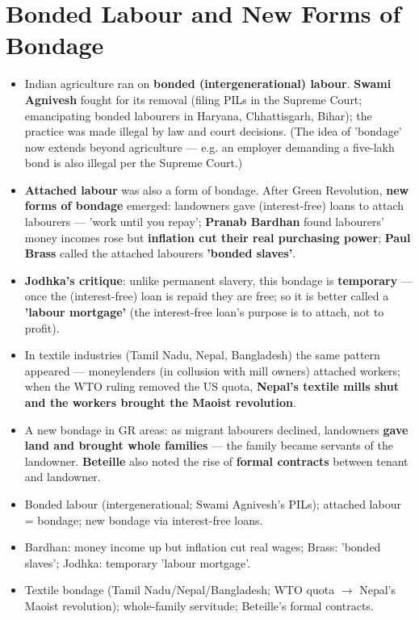 \section{Bonded Labour and New Forms of Bondage}

\begin{KeyConcept}
\begin{itemize}
\item Indian agriculture ran on \textbf{bonded (intergenerational) labour}. \textbf{Swami Agnivesh} fought for its removal (filing PILs in the Supreme Court; emancipating bonded labourers in Haryana, Chhattisgarh, Bihar); the practice was made illegal by law and court decisions. (The idea of 'bondage' now extends beyond agriculture --- e.g. an employer demanding a five-lakh bond is also illegal per the Supreme Court.)
\item \textbf{Attached labour} was also a form of bondage. After Green Revolution, \textbf{new forms of bondage} emerged: landowners gave (interest-free) loans to attach labourers --- 'work until you repay'; \textbf{Pranab Bardhan} found labourers' money incomes rose but \textbf{inflation cut their real purchasing power}; \textbf{Paul Brass} called the attached labourers \textbf{'bonded slaves'}.
\item \textbf{Jodhka's critique}: unlike permanent slavery, this bondage is \textbf{temporary} --- once the (interest-free) loan is repaid they are free; so it is better called a \textbf{'labour mortgage'} (the interest-free loan's purpose is to attach, not to profit).
\item In textile industries (Tamil Nadu, Nepal, Bangladesh) the same pattern appeared --- moneylenders (in collusion with mill owners) attached workers; when the WTO ruling removed the US quota, \textbf{Nepal's textile mills shut and the workers brought the Maoist revolution}.
\item A new bondage in GR areas: as migrant labourers declined, landowners \textbf{gave land and brought whole families} --- the family became servants of the landowner. \textbf{Beteille} also noted the rise of \textbf{formal contracts} between tenant and landowner.
\end{itemize}
\end{KeyConcept}

\begin{QuickRevision}
\begin{itemize}
\item Bonded labour (intergenerational; Swami Agnivesh's PILs); attached labour = bondage; new bondage via interest-free loans.
\item Bardhan: money income up but inflation cut real wages; Brass: 'bonded slaves'; Jodhka: temporary 'labour mortgage'.
\item Textile bondage (Tamil Nadu/Nepal/Bangladesh; WTO quota $\rightarrow$ Nepal's Maoist revolution); whole-family servitude; Beteille's formal contracts.
\end{itemize}
\end{QuickRevision}

